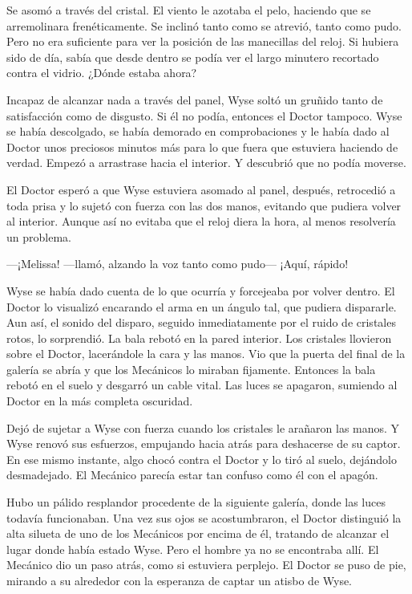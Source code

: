 {Se asomó a través del cristal. El viento le azotaba el pelo, haciendo
	que se arremolinara frenéticamente. Se inclinó tanto como se atrevió,
	tanto como pudo. Pero no era suficiente para ver la posición de las
	manecillas del reloj. Si hubiera sido de día, sabía que desde dentro se
	podía ver el largo minutero recortado contra el vidrio. ¿Dónde estaba
ahora?}

{Incapaz de alcanzar nada a través del panel, Wyse soltó un gruñido
	tanto de satisfacción como de disgusto. Si él no podía, entonces el
	Doctor tampoco. Wyse se había descolgado, se había demorado en
	comprobaciones y le había dado al Doctor unos preciosos minutos más para
	lo que fuera que estuviera haciendo de verdad. Empezó a arrastrase hacia
el interior. Y descubrió que no podía moverse.}

{El Doctor esperó a que Wyse estuviera asomado al panel, después,
	retrocedió a toda prisa y lo sujetó con fuerza con las dos manos,
	evitando que pudiera volver al interior. Aunque así no evitaba que el
reloj diera la hora, al menos resolvería un problema.}

{---¡Melissa! ---llamó, alzando la voz tanto como pudo--- ¡Aquí,
rápido!}

{Wyse se había dado cuenta de lo que ocurría y forcejeaba por volver
	dentro. El Doctor lo visualizó encarando el arma en un ángulo tal, que
	pudiera dispararle. Aun así, el sonido del disparo, seguido
	inmediatamente por el ruido de cristales rotos, lo sorprendió. La bala
	rebotó en la pared interior. Los cristales llovieron sobre el Doctor,
	lacerándole la cara y las manos. Vio que la puerta del final de la
	galería se abría y que los Mecánicos lo miraban fijamente. Entonces la
	bala rebotó en el suelo y desgarró un cable vital. Las luces se
apagaron, sumiendo al Doctor en la más completa oscuridad.}

{Dejó de sujetar a Wyse con fuerza cuando los cristales le arañaron las
	manos. Y Wyse renovó sus esfuerzos, empujando hacia atrás para
	deshacerse de su captor. En ese mismo instante, algo chocó contra el
	Doctor y lo tiró al suelo, dejándolo desmadejado. El Mecánico parecía
estar tan confuso como él con el apagón.}

{Hubo un pálido resplandor procedente de la siguiente galería, donde las
	luces todavía funcionaban. Una vez sus ojos se acostumbraron, el Doctor
	distinguió la alta silueta de uno de los Mecánicos por encima de él,
	tratando de alcanzar el lugar donde había estado Wyse. Pero el hombre ya
	no se encontraba allí. El Mecánico dio un paso atrás, como si estuviera
	perplejo. El Doctor se puso de pie, mirando a su alrededor con la
esperanza de captar un atisbo de Wyse.}

